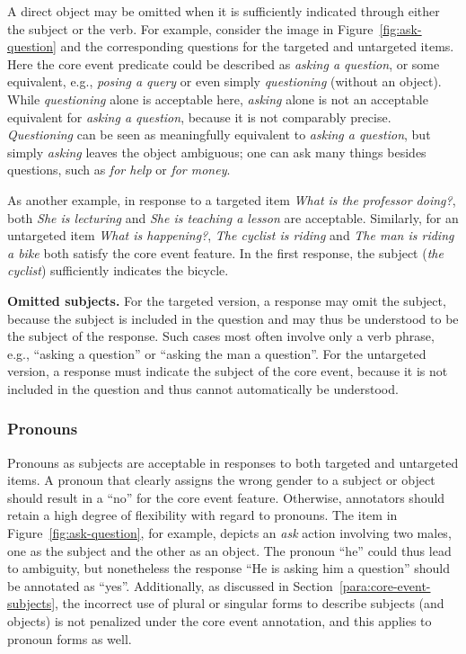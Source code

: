 \documentclass[12pt,notitlepage]{article}
\begin{document}
A direct object may be omitted when it is sufficiently indicated through either the subject or the verb. For example, consider the image in Figure~\ref{fig:ask-question} and the corresponding questions for the targeted and untargeted items. Here the core event predicate could be described as \textit{asking a question}, or some equivalent, e.g., \textit{posing a query} or even simply \textit{questioning} (without an object). While \textit{questioning} alone is acceptable here,
 \textit{asking} alone is not an acceptable equivalent for \textit{asking a question}, because it is not comparably precise. \textit{Questioning} can be seen as meaningfully equivalent to \textit{asking a question}, but simply \textit{asking} leaves the object ambiguous; one can ask many things besides questions, such as \textit{for help} or \textit{for money}.

As another example, in response to a targeted item \textit{What is the professor doing?}, both \textit{She is lecturing} and \textit{She is teaching a lesson} are acceptable. Similarly, for an untargeted item \textit{What is happening?}, \textit{The cyclist is riding} and \textit{The man is riding a bike} both satisfy the core event feature. In the first response, the subject (\textit{the cyclist}) sufficiently indicates the bicycle.


\textbf{Omitted subjects.} For the targeted version, a response may omit the subject, because the subject is included in the question and may thus be understood to be the subject of the response. Such cases most often involve only a verb phrase, e.g., ``asking a question'' or ``asking the man a question''. For the untargeted version, a response must indicate the subject of the core event, because it is not included in the question and thus cannot automatically be understood.

\subsubsection{Pronouns} Pronouns as subjects are acceptable in responses to both targeted and untargeted items. A pronoun that clearly assigns the wrong gender to a subject or object should result in a ``no'' for the core event feature. Otherwise, annotators should retain a high degree of flexibility with regard to pronouns. The item in Figure~\ref{fig:ask-question}, for example, depicts an \textit{ask} action involving two males, one as the subject and the other as an object. The pronoun ``he'' could thus lead to ambiguity, but nonetheless the response ``He is asking him a question'' should be annotated as ``yes''. Additionally, as discussed in Section~\ref{para:core-event-subjects}, the incorrect use of plural or singular forms to describe subjects (and objects) is not penalized under the core event annotation, and this applies to pronoun forms as well. 
\end{document}
